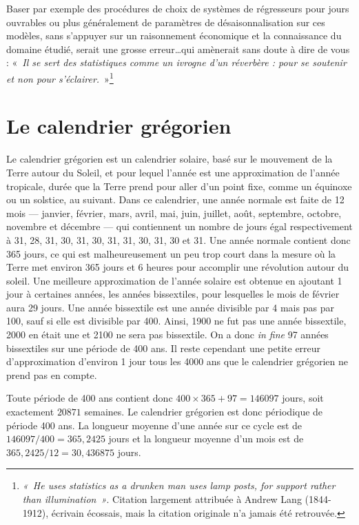 \documentclass[12pt, a4paper, french]{article}
\begin{document}
Baser par exemple des procédures de choix de systèmes de régresseurs pour jours ouvrables ou plus généralement de paramètres de désaisonnalisation sur ces modèles, sans s'appuyer sur un raisonnement économique et la connaissance du domaine étudié, serait une grosse erreur\dots qui amènerait sans doute à dire de vous : «~\textit{Il se sert des statistiques comme un ivrogne d'un réverbère : pour se soutenir et non pour s'éclairer.}~»\footnote{\textit{«~He uses statistics as a drunken man uses lamp posts, for support rather than illumination~»}. Citation largement attribuée à Andrew Lang (1844-1912), écrivain écossais, mais la citation originale n'a jamais été retrouvée.}

\newpage
\appendix
\section{Le calendrier grégorien}
\label{sec:cal}

Le calendrier grégorien est un calendrier solaire, basé sur le mouvement de la Terre autour du Soleil, et pour lequel l'année est une approximation de l'année tropicale, durée que la Terre prend pour aller d'un point fixe, comme un équinoxe ou un solstice, au suivant. Dans ce calendrier, une année normale est faite de 12 mois --- janvier, février, mars, avril, mai, juin, juillet, août, septembre, octobre, novembre et décembre --- qui contiennent un nombre de jours égal respectivement à 31, 28, 31, 30, 31, 30, 31, 31, 30, 31, 30 et 31. Une année normale contient donc 365 jours, ce qui est malheureusement un peu trop court dans la mesure où la Terre met environ 365 jours et 6 heures pour accomplir une révolution autour du soleil. Une meilleure approximation de l'année solaire est obtenue en ajoutant 1 jour à certaines années, les années bissextiles, pour lesquelles le mois de février aura 29 jours. Une année bissextile est une année divisible par 4 mais pas par 100, sauf si elle est divisible par 400. Ainsi, 1900 ne fut pas une année bissextile, 2000 en était une et 2100 ne sera pas bissextile. On a donc \emph{in fine} 97 années bissextiles sur une période de 400 ans. Il reste cependant une petite erreur d'approximation d'environ 1 jour tous les 4000 ans que le calendrier grégorien ne prend pas en compte.

Toute période de 400 ans contient donc $400 \times 365 + 97 = 146097$ jours, soit exactement $20871$ semaines. Le calendrier grégorien est donc périodique de période 400 ans. La longueur moyenne d'une année sur ce cycle est de $146097 / 400 = 365,2425$ jours et la longueur moyenne d'un mois est de $365,2425 / 12 = 30,436875$ jours.
\end{document}
